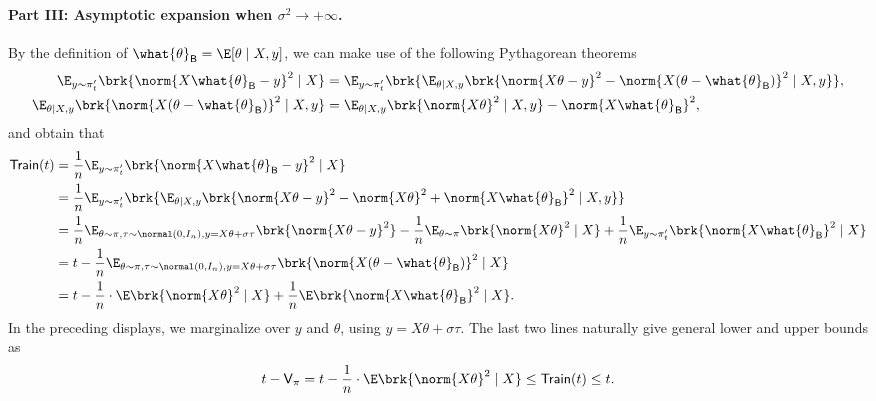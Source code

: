 \documentclass[11pt]{article}
\newcommand{\bysest}{\what{\theta}_{\mathsf{B}}}
\newcommand{\trerr}{\mathsf{Train}}
\newcommand{\tfunc}{\mathsf{Train}}
\begin{document}
\paragraph{Part III: Asymptotic expansion when $\sigma^2 \to +\infty$.} By the definition of $\bysest = \E[\theta \mid X ,y]$, we can make use of the following Pythagorean theorems
\begin{align*}
    \E_{y \sim \pi_{t}'} \brk{\norm{X \bysest - y}^2 \mid X} & = \E_{y \sim \pi_{t}'} \brk{\E_{\theta \mid X, y} \brk{\norm{X \theta - y}^2 - \norm{X (\theta - \bysest)}^2 \mid X, y}}, \\
    \E_{\theta \mid X, y} \brk{\norm{X (\theta - \bysest)}^2 \mid X, y} & = \E_{\theta \mid X, y} \brk{\norm{X \theta}^2 \mid X, y}  - \norm{X \bysest}^2,
\end{align*}
and obtain that
\begin{align}
    \tfunc(t) & = \frac{1}{n}\E_{y \sim \pi_{t}'} \brk{\norm{X \bysest - y}^2 \mid X} \nonumber \\
    & = \frac{1}{n} \E_{y \sim \pi_{t}'} \brk{\E_{\theta \mid X, y} \brk{\norm{X \theta - y}^2 - \norm{X \theta}^2 + \norm{X \bysest}^2\mid X, y}}  \nonumber \\
    & = \frac{1}{n} \E_{\theta \sim \pi, \tau \sim \normal(0, I_n), y=X\theta + \sigma\tau} \brk{\norm{X \theta -y}^2} - \frac{1}{n} \E_{\theta \sim \pi} \brk{\norm{X\theta}^2 \mid X} + \frac{1}{n} \E_{y \sim \pi_{t}'} \brk{\norm{X \bysest}^2 \mid X} \nonumber  \\
    & = t - \frac{1}{n} \E_{\theta \sim \pi, \tau \sim \normal(0, I_n), y=X\theta + \sigma\tau}  \brk{\norm{X (\theta - \bysest)}^2  \mid X} \nonumber  \\
    & = t - \frac{1}{n} \cdot \E \brk{\norm{X \theta}^2 \mid X}+ \frac{1}{n} \E\brk{\norm{X \bysest}^2  \mid X}. \label{eq:mid-high-noise-asymptotics-1} 
\end{align}
In the preceding displays, we marginalize over $y$ and $\theta$, using $y=X\theta + \sigma \tau$. The last two lines naturally give general lower and upper bounds as
\begin{align*}
    t - \mathsf{V}_{\pi} = t - \frac{1}{n} \cdot \E \brk{\norm{X \theta}^2 \mid X} \leq \tfunc(t) \leq t.
\end{align*}
\end{document}
